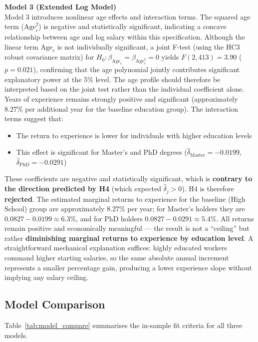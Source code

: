 \documentclass[12pt, a4paper]{article}
\begin{document}
\vspace{1em}
\textbf{Model 3 (Extended Log Model)}\\
Model 3 introduces nonlinear age effects and interaction terms.
The squared age term (\(\text{Age}_c^2\)) is negative and statistically significant, indicating a concave relationship between age and log salary within this specification. Although the linear term $\text{Age}_c$ is not individually significant, a joint F-test (using the HC3 robust covariance matrix) for $H_0\!: \beta_{\text{Age}_c} = \beta_{\text{Age}_c^2} = 0$ yields $F(2, 413) = 3.90$ ($p = 0.021$), confirming that the age polynomial jointly contributes significant explanatory power at the 5\% level. The age profile should therefore be interpreted based on the joint test rather than the individual coefficient alone.
Years of experience remains strongly positive and significant (approximately 8.27\% per additional year for the baseline education group).
The interaction terms suggest that:
\begin{itemize}
  \item The return to experience is lower for individuals with higher education levels
  \item This effect is significant for Master's and PhD degrees ($\hat{\delta}_{\text{Master}} = -0.0199$, $\hat{\delta}_{\text{PhD}} = -0.0291$)
\end{itemize}
These coefficients are negative and statistically significant, which is \textbf{contrary to the direction predicted by H4} (which expected $\hat{\delta}_j > 0$). H4 is therefore \textbf{rejected}. The estimated marginal returns to experience for the baseline (High School) group are approximately 8.27\% per year; for Master's holders they are $0.0827 - 0.0199 \approx 6.3\%$, and for PhD holders $0.0827 - 0.0291 \approx 5.4\%$. All returns remain positive and economically meaningful --- the result is not a ``ceiling'' but rather \textbf{diminishing marginal returns to experience by education level}. A straightforward mechanical explanation suffices: highly educated workers command higher starting salaries, so the same absolute annual increment represents a smaller percentage gain, producing a lower experience slope without implying any salary ceiling.

\subsection{Model Comparison}
Table~\ref{tab:model_compare} summarises the in-sample fit criteria for all three models.
\end{document}
